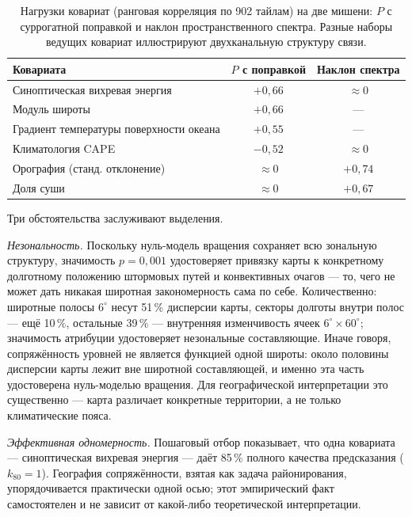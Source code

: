 \documentclass[11pt,a4paper]{article}
\begin{document}
\begin{table}[t]
\centering
\caption{Нагрузки ковариат (ранговая корреляция по 902 тайлам) на две мишени: $P$ с суррогатной поправкой и наклон пространственного спектра. Разные наборы ведущих ковариат иллюстрируют двухканальную структуру связи.}
\label{tab:loadings}
\small
\begin{tabular}{@{}lcc@{}}
\toprule
Ковариата & $P$ с поправкой & Наклон спектра\\
\midrule
Синоптическая вихревая энергия & $+0{,}66$ & $\approx0$\\
Модуль широты & $+0{,}66$ & ---\\
Градиент температуры поверхности океана & $+0{,}55$ & ---\\
Климатология CAPE & $-0{,}52$ & $\approx0$\\
Орография (станд. отклонение) & $\approx0$ & $+0{,}74$\\
Доля суши & $\approx0$ & $+0{,}67$\\
\bottomrule
\end{tabular}
\end{table}

Три обстоятельства заслуживают выделения.

\emph{Незональность.} Поскольку нуль-модель вращения сохраняет всю зональную структуру, значимость $p=0{,}001$ удостоверяет привязку карты к конкретному долготному положению штормовых путей и конвективных очагов --- то, чего не может дать никакая широтная закономерность сама по себе. Количественно: широтные полосы $6^\circ$ несут 51\,\% дисперсии карты, секторы долготы внутри полос --- ещё 10\,\%, остальные 39\,\% --- внутренняя изменчивость ячеек $6^\circ\times60^\circ$; значимость атрибуции удостоверяет незональные составляющие. Иначе говоря, сопряжённость уровней не является функцией одной широты: около половины дисперсии карты лежит вне широтной составляющей, и именно эта часть удостоверена нуль-моделью вращения. Для географической интерпретации это существенно --- карта различает конкретные территории, а не только климатические пояса.

\emph{Эффективная одномерность.} Пошаговый отбор показывает, что одна ковариата --- синоптическая вихревая энергия --- даёт 85\,\% полного качества предсказания ($k_{80}=1$). География сопряжённости, взятая как задача районирования, упорядочивается практически одной осью; этот эмпирический факт самостоятелен и не зависит от какой-либо теоретической интерпретации.
\end{document}
